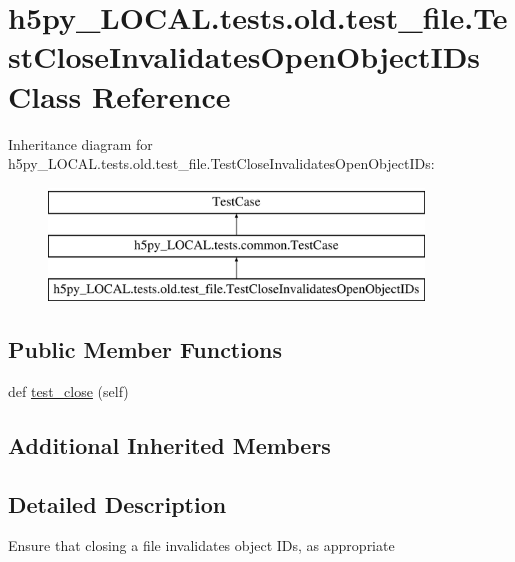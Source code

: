 \hypertarget{classh5py__LOCAL_1_1tests_1_1old_1_1test__file_1_1TestCloseInvalidatesOpenObjectIDs}{}\section{h5py\+\_\+\+L\+O\+C\+A\+L.\+tests.\+old.\+test\+\_\+file.\+Test\+Close\+Invalidates\+Open\+Object\+I\+Ds Class Reference}
\label{classh5py__LOCAL_1_1tests_1_1old_1_1test__file_1_1TestCloseInvalidatesOpenObjectIDs}
Inheritance diagram for h5py\+\_\+\+L\+O\+C\+A\+L.\+tests.\+old.\+test\+\_\+file.\+Test\+Close\+Invalidates\+Open\+Object\+I\+Ds\+:\begin{figure}[H]
\begin{center}
\leavevmode
\includegraphics[height=3.000000cm]{classh5py__LOCAL_1_1tests_1_1old_1_1test__file_1_1TestCloseInvalidatesOpenObjectIDs}
\end{center}
\end{figure}
\subsection*{Public Member Functions}
\begin{DoxyCompactItemize}
\item 
def \hyperlink{classh5py__LOCAL_1_1tests_1_1old_1_1test__file_1_1TestCloseInvalidatesOpenObjectIDs_a3ba05b53d0fcc1246b4f2235ececec79}{test\+\_\+close} (self)
\end{DoxyCompactItemize}
\subsection*{Additional Inherited Members}


\subsection{Detailed Description}
\begin{DoxyVerb}    Ensure that closing a file invalidates object IDs, as appropriate
\end{DoxyVerb}
 

